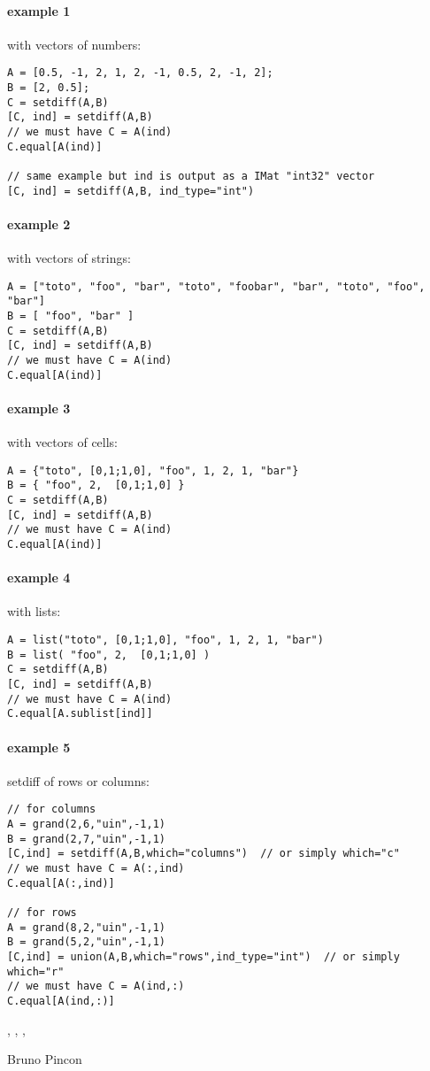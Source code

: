 \begin{examples}

\paragraph{example 1} with vectors of numbers:
\begin{Verbatim}
A = [0.5, -1, 2, 1, 2, -1, 0.5, 2, -1, 2];
B = [2, 0.5];
C = setdiff(A,B)
[C, ind] = setdiff(A,B)
// we must have C = A(ind)
C.equal[A(ind)]

// same example but ind is output as a IMat "int32" vector
[C, ind] = setdiff(A,B, ind_type="int")
\end{Verbatim}

\paragraph{example 2} with vectors of strings:
\begin{Verbatim}
A = ["toto", "foo", "bar", "toto", "foobar", "bar", "toto", "foo", "bar"]
B = [ "foo", "bar" ]
C = setdiff(A,B)
[C, ind] = setdiff(A,B)
// we must have C = A(ind)
C.equal[A(ind)]
\end{Verbatim}

\paragraph{example 3} with vectors of cells:
\begin{Verbatim}
A = {"toto", [0,1;1,0], "foo", 1, 2, 1, "bar"}
B = { "foo", 2,  [0,1;1,0] }
C = setdiff(A,B)
[C, ind] = setdiff(A,B)
// we must have C = A(ind)
C.equal[A(ind)]
\end{Verbatim}

\paragraph{example 4} with lists:
\begin{Verbatim}
A = list("toto", [0,1;1,0], "foo", 1, 2, 1, "bar")
B = list( "foo", 2,  [0,1;1,0] )
C = setdiff(A,B)
[C, ind] = setdiff(A,B)
// we must have C = A(ind)
C.equal[A.sublist[ind]]
\end{Verbatim}

\paragraph{example 5} setdiff of rows or columns:
\begin{Verbatim}
// for columns
A = grand(2,6,"uin",-1,1)
B = grand(2,7,"uin",-1,1)
[C,ind] = setdiff(A,B,which="columns")  // or simply which="c"
// we must have C = A(:,ind)
C.equal[A(:,ind)]

// for rows
A = grand(8,2,"uin",-1,1)
B = grand(5,2,"uin",-1,1)
[C,ind] = union(A,B,which="rows",ind_type="int")  // or simply which="r"
// we must have C = A(ind,:)
C.equal[A(ind,:)]
\end{Verbatim}

\end{examples}

\begin{manseealso}
  , , ,   
\end{manseealso}

\begin{authors}
  Bruno Pincon
\end{authors}
